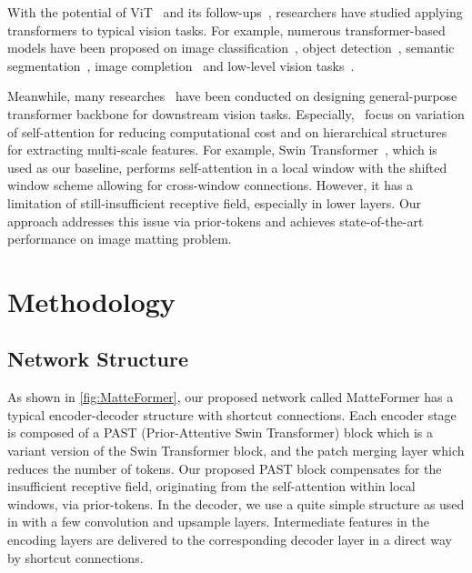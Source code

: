 \documentclass[10pt,twocolumn,letterpaper]{article}
\begin{document}
With the potential of ViT~\cite{dosovitskiy2020image} and its follow-ups~\cite{touvron2021training, yuan2021tokens, chu2021we, han2021transformer}, researchers have studied applying transformers to typical vision tasks.
For example, numerous transformer-based models have been proposed on image classification~\cite{liu2021swin, wu2020visual, li2021localvit, liu2021transformer, vaswani2021scaling, zhang2021multi, dong2021cswin, wu2021cvt, ryoo2021tokenlearner}, object detection~\cite{carion2020end, beal2020toward, liu2021swin, wang2021anchor}, semantic segmentation~\cite{zheng2021rethinking, xie2021segformer, liu2021swin}, image completion~\cite{wan2021high} and low-level vision tasks~\cite{chen2021pre, liang2021swinir, lu2021efficient}.

Meanwhile, many researches~\cite{wang2021pyramid, liu2021swin, zhang2021multi, dong2021cswin, yang2021focal, wu2021cvt} have been conducted on designing general-purpose transformer backbone for downstream vision tasks.
Especially,~\cite{liu2021swin, dong2021cswin, yang2021focal} focus on variation of self-attention for reducing computational cost and on hierarchical structures for extracting multi-scale features.
For example, Swin Transformer~\cite{liu2021swin}, which is used as our baseline, performs self-attention in a local window with the shifted window scheme allowing for cross-window connections. However, it has a limitation of still-insufficient receptive field, especially in lower layers. Our approach addresses this issue via prior-tokens and achieves state-of-the-art performance on image matting problem.

\section{Methodology}
\subsection{Network Structure}
\label{sec:structure}
As shown in \cref{fig:MatteFormer}, our proposed network called MatteFormer has a typical encoder-decoder structure with shortcut connections. Each encoder stage is composed of a PAST (Prior-Attentive Swin Transformer) block which is a variant version of the Swin Transformer block, and the patch merging layer which reduces the number of tokens. Our proposed PAST block compensates for the insufficient receptive field, originating from the self-attention within local windows, via prior-tokens. In the decoder, we use a quite simple structure as used in\cite{yu2021mask} with a few convolution and upsample layers. Intermediate features in the encoding layers are delivered to the corresponding decoder layer in a direct way by shortcut connections.
\end{document}
